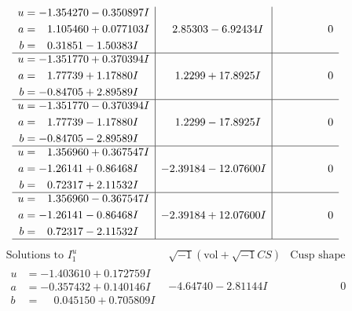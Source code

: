 \documentclass[1p]{elsarticle_modified}
\theoremstyle{definition}
\newcommand{\I}{\sqrt{-1}}
\begin{document}
$$\begin{array}{c|c|c}
\begin{aligned}
u &= -1.354270 - 0.350897 I \\
a &= \phantom{-}1.105460 + 0.077103 I \\
b &= \phantom{-}0.31851 - 1.50383 I\end{aligned}
 & \phantom{-}2.85303 - 6.92434 I & \phantom{-0.000000 } 0 \\ \hline\begin{aligned}
u &= -1.351770 + 0.370394 I \\
a &= \phantom{-}1.77739 + 1.17880 I \\
b &= -0.84705 + 2.89589 I\end{aligned}
 & \phantom{-}1.2299 + 17.8925 I & \phantom{-0.000000 } 0 \\ \hline\begin{aligned}
u &= -1.351770 - 0.370394 I \\
a &= \phantom{-}1.77739 - 1.17880 I \\
b &= -0.84705 - 2.89589 I\end{aligned}
 & \phantom{-}1.2299 - 17.8925 I & \phantom{-0.000000 } 0 \\ \hline\begin{aligned}
u &= \phantom{-}1.356960 + 0.367547 I \\
a &= -1.26141 + 0.86468 I \\
b &= \phantom{-}0.72317 + 2.11532 I\end{aligned}
 & -2.39184 - 12.07600 I & \phantom{-0.000000 } 0 \\ \hline\begin{aligned}
u &= \phantom{-}1.356960 - 0.367547 I \\
a &= -1.26141 - 0.86468 I \\
b &= \phantom{-}0.72317 - 2.11532 I\end{aligned}
 & -2.39184 + 12.07600 I & \phantom{-0.000000 } 0\\
 \hline 
 \end{array}$$\newpage$$\begin{array}{c|c|c}  
\text{Solutions to }I^u_{1}& \I (\text{vol} + \sqrt{-1}CS) & \text{Cusp shape}\\
 \hline 
\begin{aligned}
u &= -1.403610 + 0.172759 I \\
a &= -0.357432 + 0.140146 I \\
b &= \phantom{-}0.045150 + 0.705809 I\end{aligned}
 & -4.64740 - 2.81144 I & \phantom{-0.000000 } 0 \\ \hline\begin{aligned}

\end{aligned}
\end{array}$$
\end{document}
